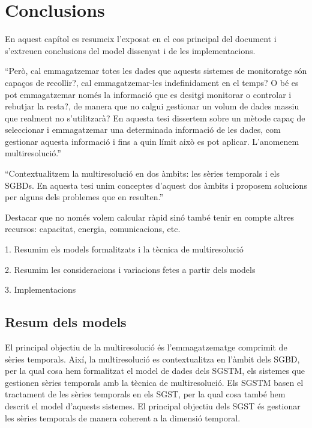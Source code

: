 \chapter{Conclusions}
\label{sec:conclusions}



En aquest capítol es resumeix l'exposat en el cos principal del
document i s'extreuen conclusions del model dissenyat i de les
implementacions.


``Però, cal emmagatzemar totes les dades que aquests sistemes de
monitoratge són capaços de recollir?, cal emmagatzemar-les
indefinidament en el temps? O bé es pot emmagatzemar només la
informació que es desitgi monitorar o controlar i rebutjar la resta?,
de manera que no calgui gestionar un volum de dades massiu que
realment no s'utilitzarà? En aquesta tesi dissertem sobre un mètode
capaç de seleccionar i emmagatzemar una determinada informació de les
dades, com gestionar aquesta informació i fins a quin límit això es pot
aplicar. L'anomenem multiresolució.''

``Contextualitzem la multiresolució en dos àmbits: les sèries temporals
i els \glspl{SGBD}. En aquesta tesi unim conceptes d'aquest dos àmbits
i proposem solucions per alguns dels problemes que en resulten.''


Destacar que no només volem calcular ràpid sinó també tenir en compte altres recursos: capacitat, energia, comunicacions, etc.



1. Resumim els models formalitzats i la tècnica de multiresolució

2. Resumim les consideracions i variacions fetes a partir dels models

3. Implementacions










\section{Resum dels models}


El principal objectiu de la multiresolució és l'emmagatzematge
comprimit de sèries temporals. Així, la multiresolució es
contextualitza en l'àmbit dels \gls{SGBD}, per la qual cosa hem
formalitzat el model de dades dels \gls{SGSTM}, els sistemes que
gestionen sèries temporals amb la tècnica de multiresolució. Els
\gls{SGSTM} basen el tractament de les sèries temporals en els
\gls{SGST}, per la qual cosa també hem descrit el model d'aquests
sistemes. El principal objectiu dels \gls{SGST} és gestionar les
sèries temporals de manera coherent a la dimensió temporal.



